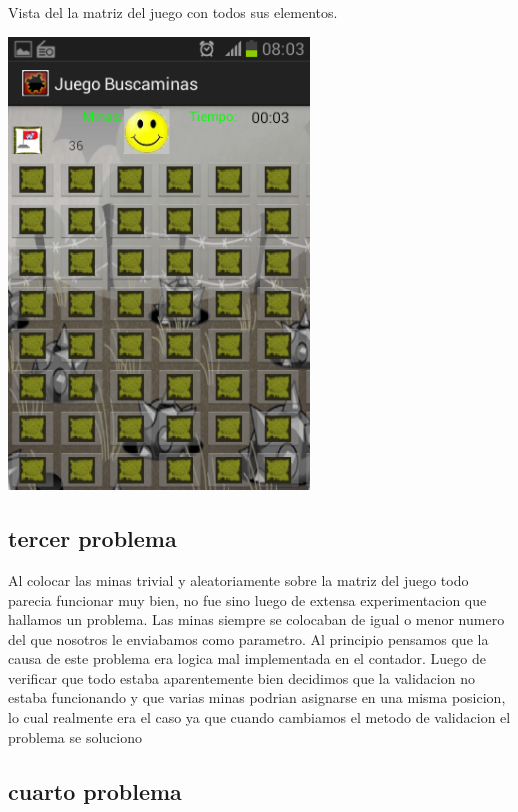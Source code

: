 \documentclass[11pt]{article} %
\begin{document}
\begin{center}
Vista del la matriz del juego con todos sus elementos. 

\includegraphics[width=8cm]{imagenes/Screenshot_2013-12-11-08-03-01.png}
\end{center}

\subsection{tercer problema }

Al colocar las minas trivial y aleatoriamente sobre la matriz del juego todo parecia funcionar muy bien, no fue sino luego de extensa experimentacion que hallamos un problema.
Las minas siempre se colocaban de igual o menor numero del que nosotros le enviabamos como parametro. Al principio pensamos que la causa de este problema era logica mal implementada en el contador. Luego de verificar que todo estaba aparentemente bien decidimos que la validacion no estaba funcionando y que varias minas podrian asignarse en una misma posicion, lo cual realmente era el caso ya que cuando cambiamos el metodo de validacion el problema se soluciono


\subsection{cuarto problema }
\end{document}
